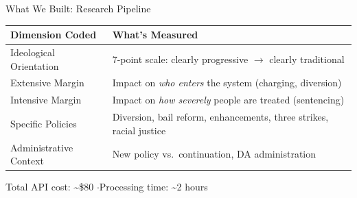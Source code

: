 \documentclass[aspectratio=169, 11pt]{beamer}
\newcommand{\tablefont}{\fontsize{7.5}{9.5}\selectfont}
\begin{document}
\begin{frame}{What We Built: Research Pipeline}
\begin{center}
\end{center}
\vspace{-2pt}
{\tablefont
\begin{tabularx}{\textwidth}{lX}
\toprule
\textbf{Dimension Coded} & \textbf{What's Measured} \\
\midrule
Ideological Orientation & 7-point scale: clearly progressive $\to$ clearly traditional \\
Extensive Margin & Impact on \emph{who enters} the system (charging, diversion) \\
Intensive Margin & Impact on \emph{how severely} people are treated (sentencing) \\
Specific Policies & Diversion, bail reform, enhancements, three strikes, racial justice \\
Administrative Context & New policy vs.\ continuation, DA administration \\
\bottomrule
\end{tabularx}}
\vspace{2pt}
\begin{center}\scriptsize Total API cost: \textasciitilde\$80 \quad$\cdot$\quad Processing time: \textasciitilde 2 hours\end{center}
\end{frame}
\end{document}
